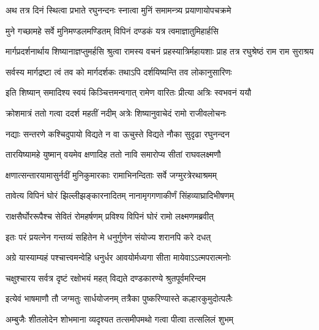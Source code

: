 



\twolineshloka
{अथ तत्र दिनं स्थित्वा प्रभाते रघुनन्दनः}
{स्नात्वा मुनिं समामन्त्र्य प्रयाणायोपचक्रमे} %

\twolineshloka
{मुने गच्छामहे सर्वे मुनिमण्डलमण्डितम्}
{विपिनं दण्डकं यत्र त्वमाज्ञातुमिहार्हसि} %

\threelineshloka
{मार्गप्रदर्शनार्थाय शिष्यानाज्ञप्तुमर्हसि}
{श्रुत्वा रामस्य वचनं प्रहस्यात्रिर्महायशाः}
{प्राह तत्र रघुश्रेष्ठं राम राम सुराश्रय} %

\twolineshloka
{सर्वस्य मार्गद्रष्टा त्वं तव को मार्गदर्शकः}
{तथाऽपि दर्शयिष्यन्ति तव लोकानुसारिणः} %

\twolineshloka
{इति शिष्यान् समादिश्य स्वयं किञ्चित्तमन्वगात्}
{रामेण वारितः प्रीत्या अत्रिः स्वभवनं ययौ} %

\twolineshloka
{क्रोशमात्रं ततो गत्वा ददर्श महतीं नदीम्}
{अत्रेः शिष्यानुवाचेदं रामो राजीवलोचनः} %

\twolineshloka
{नद्याः सन्तरणे कश्चिदुपायो विद्यते न वा}
{ऊचुस्ते विद्यते नौका सुदृढा रघुनन्दन} %

\twolineshloka
{तारयिष्यामहे युष्मान् वयमेव क्षणादिह}
{ततो नावि समारोप्य सीतां राघवलक्ष्मणौ} %

\twolineshloka
{क्षणात्सन्तारयामासुर्नदीं मुनिकुमारकाः}
{रामाभिनन्दिताः सर्वे जग्मुरत्रेरथाश्रमम्} %

\twolineshloka
{तावेत्य विपिनं घोरं झिल्लीझङ्कारनादितम्}
{नानामृगगणाकीर्णं सिंहव्याघ्रादिभीषणम्} %

\twolineshloka
{राक्षसैर्घोररूपैश्च सेवितं रोमहर्षणम्}
{प्रविश्य विपिनं घोरं रामो लक्ष्मणमब्रवीत्} %

\twolineshloka
{इतः परं प्रयत्नेन गन्तव्यं सहितेन मे}
{धनुर्गुणेन संयोज्य शरानपि करे दधत्} %

\twolineshloka
{अग्रे यास्याम्यहं पश्चात्त्वमन्वेहि धनुर्धर}
{आवयोर्मध्यगा सीता मायेवाऽऽत्मपरात्मनोः} %

\twolineshloka
{चक्षुश्चारय सर्वत्र दृष्टं रक्षोभयं महत्}
{विद्यते दण्डकारण्ये श्रुतपूर्वमरिन्दम} %

\twolineshloka
{इत्येवं भाषमाणौ तौ जग्मतुः सार्धयोजनम्}
{तत्रैका पुष्करिण्यास्ते कल्हारकुमुदोत्पलैः} %

\twolineshloka
{अम्बुजैः शीतलोदेन शोभमाना व्यदृश्यत}
{तत्समीपमथो गत्वा पीत्वा तत्सलिलं शुभम्} %

